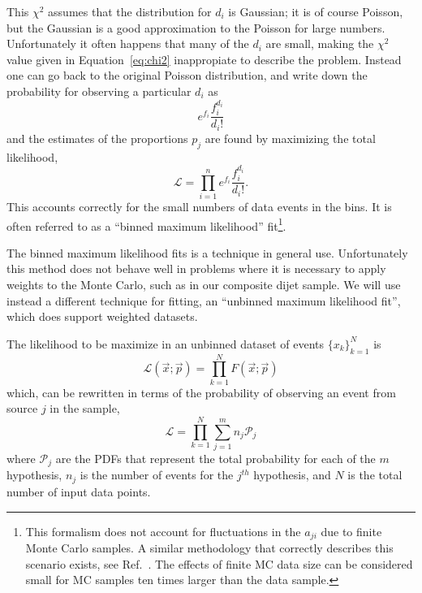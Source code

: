 This $\chi^2$ assumes that the distribution for $d_i$ is Gaussian; it is of course Poisson, but the Gaussian is a good approximation to the Poisson for large numbers. Unfortunately it often happens that many of the $d_i$ are small, making the $\chi^2$ value given in Equation~\ref{eq:chi2} inappropiate to describe the problem.  Instead one can go back to the original Poisson distribution, and write down the probability for observing a particular $d_i$ as
%
\begin{equation}
e^{f_i} \frac{f_i^{d_i}}{d_i!} 
\end{equation}
%
and the estimates of the proportions $p_j$ are found by maximizing the total likelihood, 
%
\begin{equation}
\mathcal{L} = \prod^n_{i=1} e^{f_i} \frac{f_i^{d_i}}{d_i!}.
\end{equation}
%
This accounts correctly for the small numbers of data events in the bins.  It is often referred to as a ``binned maximum likelihood'' fit\footnote{This formalism does not account for fluctuations in the $a_{ji}$ due to finite Monte Carlo samples. A similar methodology that correctly describes this scenario exists, see Ref.~\cite{Barlow1993219}. The effects of finite MC data size can be considered small for MC samples ten times larger than the data sample. }.


The binned maximum likelihood fits is a technique in general use. Unfortunately  this method does not behave well in problems where it is necessary to apply weights to the Monte Carlo, such as in our composite dijet sample. We will use instead a different technique for fitting, an ``unbinned maximum likelihood fit'', which does support weighted datasets. %

The likelihood to be maximize in an unbinned dataset of events $\{x_k\}^N_{k=1}$ is
%
\begin{equation}
\mathcal{L}(\vec{x};\vec{p}) =\prod^N_{k=1} F(\vec{x};\vec{p})
\end{equation}
%
which, can be rewritten in terms of the probability of observing an event from source $j$ in the sample,
%
\begin{equation}
\mathcal{L} =  \prod^N_{k=1} \sum^m_{j=1} n_j  \mathcal{P}_j
\end{equation}
%
where $\mathcal{P}_j$ are the PDFs that represent the total probability for each of the $m$ hypothesis, $n_j$ is the number of events for the $j^{th}$ hypothesis, and $N$ is the total number of input data points.


